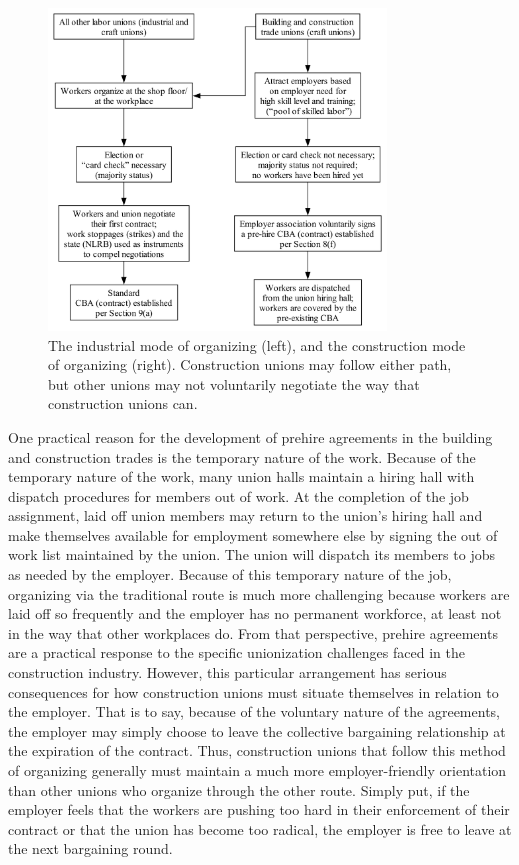 \documentclass[12pt]{article}
\begin{document}
\begin{figure}[ht]
  \centering
  \includegraphics[width=0.8\textwidth]{images/organizing_paths}
  \captionsetup{justification=centering, singlelinecheck=false, margin=2cm}
  \caption{The industrial mode of organizing (left), and the construction mode of organizing (right). Construction unions may follow either path, but other unions may not voluntarily negotiate the way that construction unions can.}
  \label{fig:organizing_paths}
\end{figure}

One practical reason for the development of prehire agreements in the building and construction trades is the temporary nature of the work. Because of the temporary nature of the work, many union halls maintain a hiring hall with dispatch procedures for members out of work. At the completion of the job assignment, laid off union members may return to the union’s hiring hall and make themselves available for employment somewhere else by signing the out of work list maintained by the union. The union will dispatch its members to jobs as needed by the employer. Because of this temporary nature of the job, organizing via the traditional route is much more challenging because workers are laid off so frequently and the employer has no permanent workforce, at least not in the way that other workplaces do. From that perspective, prehire agreements are a practical response to the specific unionization challenges faced in the construction industry. However, this particular arrangement has serious consequences for how construction unions must situate themselves in relation to the employer. That is to say, because of the voluntary nature of the agreements, the employer may simply choose to leave the collective bargaining relationship at the expiration of the contract. Thus, construction unions that follow this method of organizing generally must maintain a much more employer-friendly orientation than other unions who organize through the other route. Simply put, if the employer feels that the workers are pushing too hard in their enforcement of their contract or that the union has become too radical, the employer is free to leave at the next bargaining round.
\end{document}
